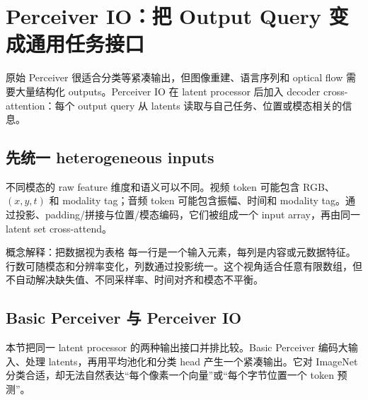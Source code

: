 \section{Perceiver IO：把 Output Query 变成通用任务接口}

原始 Perceiver 很适合分类等紧凑输出，但图像重建、语言序列和 optical flow 需要大量结构化 outputs。Perceiver IO 在 latent processor 后加入 decoder cross-attention：每个 output query 从 latents 读取与自己任务、位置或模态相关的信息。

\subsection{先统一 heterogeneous inputs}

不同模态的 raw feature 维度和语义可以不同。视频 token 可能包含 RGB、$(x,y,t)$ 和 modality tag；音频 token 可能包含振幅、时间和 modality tag。通过投影、padding/拼接与位置/模态编码，它们被组成一个 input array，再由同一 latent set cross-attend。


\begin{knowledgebox}{概念解释：把数据视为表格}
每一行是一个输入元素，每列是内容或元数据特征。行数可随模态和分辨率变化，列数通过投影统一。这个视角适合任意有限数组，但不自动解决缺失值、不同采样率、时间对齐和模态不平衡。
\end{knowledgebox}


\subsection{Basic Perceiver 与 Perceiver IO}

本节把同一 latent processor 的两种输出接口并排比较。Basic Perceiver 编码大输入、处理 latents，再用平均池化和分类 head 产生一个紧凑输出。它对 ImageNet 分类合适，却无法自然表达“每个像素一个向量”或“每个字节位置一个 token 预测”。


